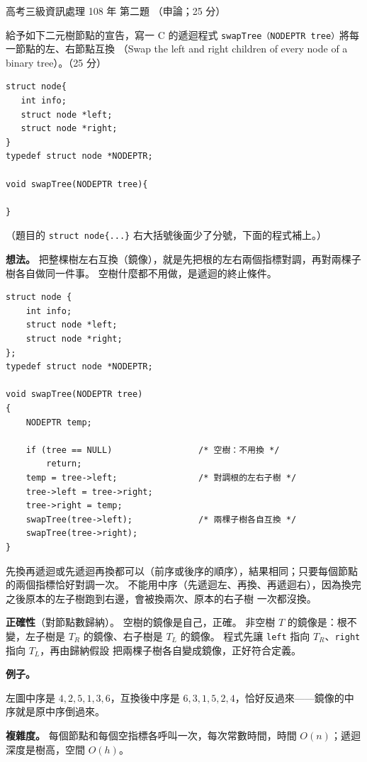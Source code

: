 \begin{pastexam}[label={px:gk3-108-ds-02}]{高考三級資訊處理 108 年 第二題}
（申論；25 分）

給予如下二元樹節點的宣告，寫一 C 的遞迴程式 \texttt{swapTree（NODEPTR tree）}將每一節點的左、右節點互換
（Swap the left and right children of every node of a binary tree）。（25 分）
\begin{verbatim}
struct node{
   int info;
   struct node *left;
   struct node *right;
}
typedef struct node *NODEPTR;

void swapTree(NODEPTR tree){

}
\end{verbatim}
\end{pastexam}

\begin{pastsoln}
（題目的 \texttt{struct node\{...\}} 右大括號後面少了分號，下面的程式補上。）

\textbf{想法。} 把整棵樹左右互換（鏡像），就是先把根的左右兩個指標對調，再對兩棵子樹各自做同一件事。
空樹什麼都不用做，是遞迴的終止條件。
\begin{verbatim}
struct node {
    int info;
    struct node *left;
    struct node *right;
};
typedef struct node *NODEPTR;

void swapTree(NODEPTR tree)
{
    NODEPTR temp;

    if (tree == NULL)                 /* 空樹：不用換 */
        return;
    temp = tree->left;                /* 對調根的左右子樹 */
    tree->left = tree->right;
    tree->right = temp;
    swapTree(tree->left);             /* 兩棵子樹各自互換 */
    swapTree(tree->right);
}
\end{verbatim}
先換再遞迴或先遞迴再換都可以（前序或後序的順序），結果相同；只要每個節點的兩個指標恰好對調一次。
不能用中序（先遞迴左、再換、再遞迴右），因為換完之後原本的左子樹跑到右邊，會被換兩次、原本的右子樹
一次都沒換。

\textbf{正確性}（對節點數歸納）。 空樹的鏡像是自己，正確。 非空樹 $T$ 的鏡像是：根不變，左子樹是 $T_R$
的鏡像、右子樹是 $T_L$ 的鏡像。 程式先讓 \texttt{left} 指向 $T_R$、\texttt{right} 指向 $T_L$，再由歸納假設
把兩棵子樹各自變成鏡像，正好符合定義。

\textbf{例子。}
\begin{center}
\end{center}
左圖中序是 $4, 2, 5, 1, 3, 6$，互換後中序是 $6, 3, 1, 5, 2, 4$，恰好反過來——鏡像的中序就是原中序倒過來。

\textbf{複雜度。} 每個節點和每個空指標各呼叫一次，每次常數時間，時間 $O(n)$；遞迴深度是樹高，空間
$O(h)$。
\end{pastsoln}
